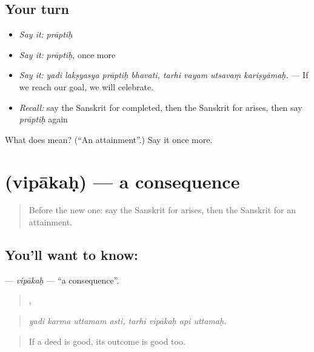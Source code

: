 \subsection*{Your turn}
\begin{itemize}
\raggedright
  \item \emph{Say it:} \emph{prāptiḥ}
  \item \emph{Say it:} \emph{prāptiḥ}, once more
  \item \emph{Say it:} \emph{yadi lakṣyasya prāptiḥ bhavati, tarhi vayam utsavaṃ kariṣyāmaḥ.} — If we reach our goal, we will celebrate.
  \item \emph{Recall:} say the Sanskrit for completed, then the Sanskrit for arises, then say \emph{prāptiḥ} again
\end{itemize}

\begin{tcolorbox}[breakable,colback=teal!4,colframe=teal!35!black,title={Before you move on}]
What does  mean? (\textquotedblleft{}An attainment\textquotedblright{}.) Say it once more.
\end{tcolorbox}
\section[\texorpdfstring{\sk{विपाकः} (vipākaḥ)}{विपाकः (vipākaḥ)}]{ (vipākaḥ) — a consequence}

\label{lesson:SA-C546-vipakah}



\begin{quote}
Before the new one: say the Sanskrit for arises, then the Sanskrit for an attainment.
\end{quote}

\subsection*{You'll want to know: }
\textbf{} — \emph{vipākaḥ} — \textquotedblleft{}a consequence\textquotedblright{}.

\begin{quote}
   ,    
\end{quote}

\begin{quote}
\emph{yadi karma uttamam asti, tarhi vipākaḥ api uttamaḥ.}
\end{quote}

\begin{quote}
If a deed is good, its outcome is good too.
\end{quote}


